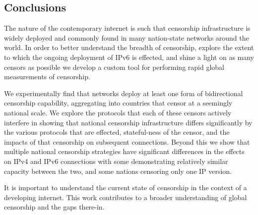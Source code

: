 \subsection{Conclusions} \label{sec:discussion:conclusions}

The nature of the contemporary internet is such that censorship infrastructure
is widely deployed and commonly found in many nation-state networks around the
world. In order to better understand the breadth of censorship, explore the
extent to which the ongoing deployment of IPv6 is effected, and shine a light on
as many censors as possible we develop a custom tool for performing rapid global
measurements of censorship.

We experimentally find that  networks deploy at least one form of
bidirectional censorship capability, aggregating into  countries that
censor at a seemingly national scale. We explore the protocols that each of
these censors actively interfere in showing that national censorship
infrastructure differs significantly by the various protocols that are effected,
stateful-ness of the censor, and the impacts of that censorship on subsequent
connections. Beyond this we show that multiple national censorship strategies
have significant differences in the effects on IPv4 and IPv6 connections with
some demonstrating relatively similar capacity between the two, and some nations
censoring only one IP version.

It is important to understand the current state of censorship in the context of
a developing internet. This work contributes to a broader understanding of
global censorship and the gaps there-in.
